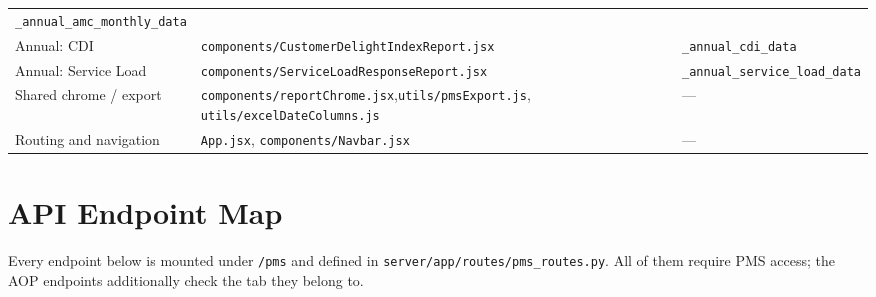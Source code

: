 \documentclass[11pt,a4paper]{article}
\newcommand{\file}[1]{\texttt{\small #1}}
\begin{document}
\begin{longtable}{@{}p{4.2cm}p{4.8cm}p{5.8cm}@{}}
\texttt{\_annual\_amc\_monthly\_data} \\
\addlinespace
Annual: CDI &
\file{components/CustomerDelightIndexReport.jsx} &
\texttt{\_annual\_cdi\_data} \\
\addlinespace
Annual: Service Load &
\file{components/ServiceLoadResponseReport.jsx} &
\texttt{\_annual\_service\_load\_data} \\
\addlinespace
Shared chrome / export &
\file{components/reportChrome.jsx},\newline \file{utils/pmsExport.js},\newline
\file{utils/excelDateColumns.js} & --- \\
\addlinespace
Routing and navigation &
\file{App.jsx}, \file{components/Navbar.jsx} & --- \\
\end{longtable}

\appendix
\section{API Endpoint Map}

Every endpoint below is mounted under \file{/pms} and defined in
\file{server/app/routes/pms\_routes.py}. All of them require PMS access; the AOP endpoints
additionally check the tab they belong to.
\end{document}
